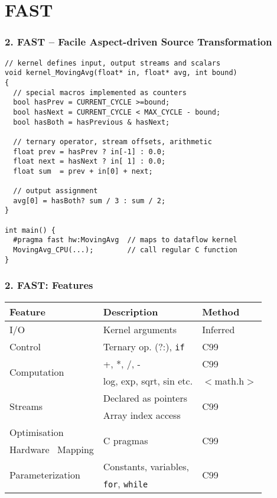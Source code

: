 \section{FAST}

\begin{frame}[fragile]
  \frametitle{2. FAST -- Facile Aspect-driven Source Transformation}

\begin{lstlisting}[style=MaxC]
// kernel defines input, output streams and scalars
void kernel_MovingAvg(float* in, float* avg, int bound)
{
  // special macros implemented as counters
  bool hasPrev = CURRENT_CYCLE >=bound;
  bool hasNext = CURRENT_CYCLE < MAX_CYCLE - bound;
  bool hasBoth = hasPrevious & hasNext;

  // ternary operator, stream offsets, arithmetic
  float prev = hasPrev ? in[-1] : 0.0;
  float next = hasNext ? in[ 1] : 0.0;
  float sum  = prev + in[0] + next;

  // output assignment
  avg[0] = hasBoth? sum / 3 : sum / 2;
}

int main() {
  #pragma fast hw:MovingAvg  // maps to dataflow kernel
  MovingAvg_CPU(...);        // call regular C function
}
\end{lstlisting}
\end{frame}

\begin{frame}
  \frametitle{2. FAST: Features}

\begin{table}[!h]
  \centering
\renewcommand{\arraystretch}{1.4}
\begin{tabular}{l|l|l}
\hline
\bf{Feature}                        & \bf{Description}              & \bf{Method}          \\
\hline\hline
  I/O                               & Kernel arguments              & Inferred             \\
\hline
  Control                           & Ternary op. (?:), \texttt{if} & C99                  \\
\hline
\multirow{2}{*}{Computation}        & +, *, /, -                    & C99                  \\
                                    & log, exp, sqrt, sin etc.      & $<$math.h$>$         \\
\hline
  \multirow{2}{*}{Streams}          & Declared as pointers          & \multirow{2}{*}{C99} \\
                                    & Array index access     &                      \\
\hline
  Optimisation                      & \multirow{2}{*}{C pragmas}    & \multirow{2}{*}{C99} \\
  Hardware \  Mapping               &                               &                      \\
\hline
  \multirow{2}{*}{Parameterization} & Constants, variables,         & \multirow{2}{*}{C99} \\
                                    & \texttt{for}, \texttt{while}  &                      \\
\end{tabular}
\end{table}
\end{frame}

